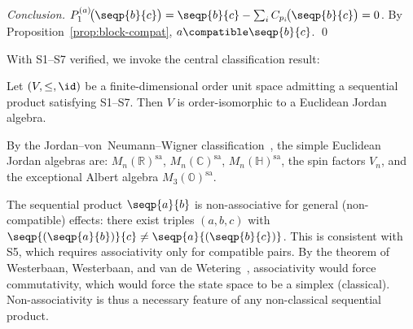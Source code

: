\emph{Conclusion.}
$P_1^{(a)}\!\bigl(\seqp{b}{c}\bigr)
= \seqp{b}{c} - \sum_i C_{p_i}\!\bigl(\seqp{b}{c}\bigr) = 0$.
By Proposition~\ref{prop:block-compat},
$a \compatible \seqp{b}{c}$. \qed

\bigskip

With S1--S7 verified, we invoke the central classification result:

\begin{theorem}
\label{thm:EJA}
Let $(V, \le, \id)$ be a finite-dimensional order unit space
admitting a sequential product satisfying S1--S7. Then $V$ is
order-isomorphic to a Euclidean Jordan algebra.
\end{theorem}

By the Jordan--von~Neumann--Wigner classification~\cite{JordanVonNeumannWigner1934}, the
simple Euclidean Jordan algebras are: $M_n(\mathbb{R})^{\mathrm{sa}}$,
$M_n(\mathbb{C})^{\mathrm{sa}}$, $M_n(\mathbb{H})^{\mathrm{sa}}$, the
spin factors $V_n$, and the exceptional Albert algebra
$M_3(\mathbb{O})^{\mathrm{sa}}$.

\begin{remark}
The sequential product $\seqp{a}{b}$ is non-associative for general
(non-compatible) effects: there exist triples $(a,b,c)$ with
$\seqp{(\seqp{a}{b})}{c} \ne \seqp{a}{(\seqp{b}{c})}$. This is consistent with
S5, which requires associativity only for compatible pairs. By the theorem
of Westerbaan, Westerbaan, and van de
Wetering~\cite{WesterbaanWesterbaanVdW2020}, associativity would force
commutativity, which would force the state space to be a simplex
(classical). Non-associativity is thus a necessary feature of any
non-classical sequential product.
\end{remark}
